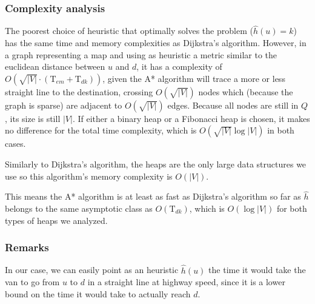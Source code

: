 \subsubsection{Complexity analysis}
The poorest choice of heuristic that optimally solves the problem ($\hat{h}(u)=k$) has the same time and memory complexities as Dijkstra's algorithm. However, in a graph representing a map and using as heuristic a metric similar to the euclidean distance between $u$ and $d$, it has a complexity of $O(\sqrt{|V|} \cdot (\text{T}_{em}+\text{T}_{dk}))$, given the A* algorithm will trace a more or less straight line to the destination, crossing $O(\sqrt{|V|})$ nodes which (because the graph is sparse) are adjacent to $O(\sqrt{|V|})$ edges. Because all nodes are still in $Q$, its size is still $|V|$. If either a binary heap or a Fibonacci heap is chosen, it makes no difference for the total time complexity, which is $O(\sqrt{|V|} \log |V|)$ in both cases.\par
Similarly to Dijkstra's algorithm, the heaps are the only large data structures we use so this algorithm's memory complexity is $O(|V|)$.\par
This means the A* algorithm is at least as fast as Dijkstra's algorithm so far as $\hat{h}$ belongs to the same asymptotic class as $O(\text{T}_{dk})$, which is $O(\log |V|)$ for both types of heaps we analyzed.
\subsubsection{Remarks}
In our case, we can easily point as an heuristic $\hat{h}(u)$ the time it would take the van to go from $u$ to $d$ in a straight line at highway speed, since it is a lower bound on the time it would take to actually reach $d$.
